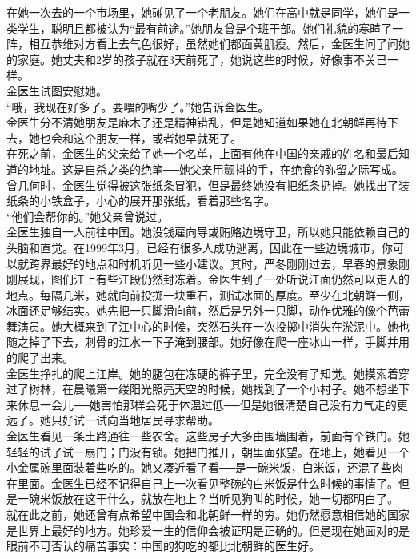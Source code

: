 在她一次去的一个市场里，她碰见了一个老朋友。她们在高中就是同学，她们是一类学生，聪明且都被认为“最有前途。”她朋友曾是个班干部。她们礼貌的寒暄了一阵，相互恭维对方看上去气色很好，虽然她们都面黄肌瘦。然后，金医生问了问她的家庭。她丈夫和2岁的孩子就在3天前死了，她说这些的时候，好像事不关已一样。\\

金医生试图安慰她。\\

“哦，我现在好多了。要喂的嘴少了。”她告诉金医生。\\

金医生分不清她朋友是麻木了还是精神错乱，但是她知道如果她在北朝鲜再待下去，她也会和这个朋友一样，或者她早就死了。\\

在死之前，金医生的父亲给了她一个名单，上面有他在中国的亲戚的姓名和最后知道的地址。这是自杀之类的绝笔──她父亲用颤抖的手，在绝食的弥留之际写成。曾几何时，金医生觉得被这张纸条冒犯，但是最终她没有把纸条扔掉。她找出了装纸条的小铁盒子，小心的展开那张纸，看着那些名字。\\

“他们会帮你的。”她父亲曾说过。\\

金医生独自一人前往中国。她没钱雇向导或贿赂边境守卫，所以她只能依赖自己的头脑和直觉。在1999年3月，已经有很多人成功逃离，因此在一些边境城市，你可以就跨界最好的地点和时机听见一些小建议。其时，严冬刚刚过去，早春的景象刚刚展现，图们江上有些江段仍然封冻着。金医生到了一处听说江面仍然可以走人的地点。每隔几米，她就向前投掷一块重石，测试冰面的厚度。至少在北朝鲜一侧，冰面还足够结实。她先把一只脚滑向前，然后是另外一只脚，动作优雅的像个芭蕾舞演员。她大概来到了江中心的时候，突然石头在一次投掷中消失在淤泥中。她也随之掉了下去，刺骨的江水一下子淹到腰部。她好像在爬一座冰山一样，手脚并用的爬了出来。\\

金医生挣扎的爬上江岸。她的腿包在冻硬的裤子里，完全没有了知觉。她摸索着穿过了树林，在晨曦第一缕阳光照亮天空的时候，她找到了一个小村子。她不想坐下来休息一会儿──她害怕那样会死于体温过低──但是她很清楚自己没有力气走的更远了。她只好试一试向当地居民寻求帮助。\\

金医生看见一条土路通往一些农舍。这些房子大多由围墙围着，前面有个铁门。她轻轻的试了试一扇门；门没有锁。她把门推开，朝里面张望。在地上，她看见一个小金属碗里面装着些吃的。她又凑近看了看──是一碗米饭，白米饭，还混了些肉在里面。金医生已经不记得自己上一次看见整碗的白米饭是什么时候的事情了。但是一碗米饭放在这干什么，就放在地上？当听见狗叫的时候，她一切都明白了。\\

就在此之前，她还曾有点希望中国会和北朝鲜一样的穷。她仍然愿意相信她的国家是世界上最好的地方。她珍爱一生的信仰会被证明是正确的。但是现在她面对的是眼前不可否认的痛苦事实：中国的狗吃的都比北朝鲜的医生好。\\
